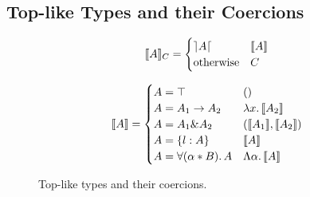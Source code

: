 \subsection{Top-like Types and their Coercions}\label{subsec:top-types}
\begin{figure}[!t]
\begin{spacing}{0.9}
\begin{minipage}[t]{.5\textwidth}
\vspace{-7pt}
  \begin{center} 
  \[
  \llbracket A \rrbracket_{C} = 
  \begin{cases} 
        \rceil A \lceil & \llbracket A \rrbracket \\ 
        \text{otherwise} & {C} 
  \end{cases}
  \]
  \end{center}
\end{minipage}
\begin{minipage}[t]{.5\textwidth}
\vspace{-7pt}
  \[
  \llbracket A \rrbracket = 
  \begin{cases} 
        A = \top & () \\
        A = A_1 \to A_2 & \lambda x.\, \llbracket A_2 \rrbracket \\
        A = A_1 \& A_2 & (\llbracket A_1 \rrbracket, \llbracket A_2 \rrbracket) \\
        A = \{ l : A \} & {\llbracket A \rrbracket} \\
        A = \forall (\alpha * B).\, A & \Lambda \alpha.\, \llbracket A \rrbracket 
  \end{cases}
  \]
\end{minipage}
\end{spacing}
  \caption{Top-like types and their coercions.}
  \label{fig:andcoercion}
\end{figure}

